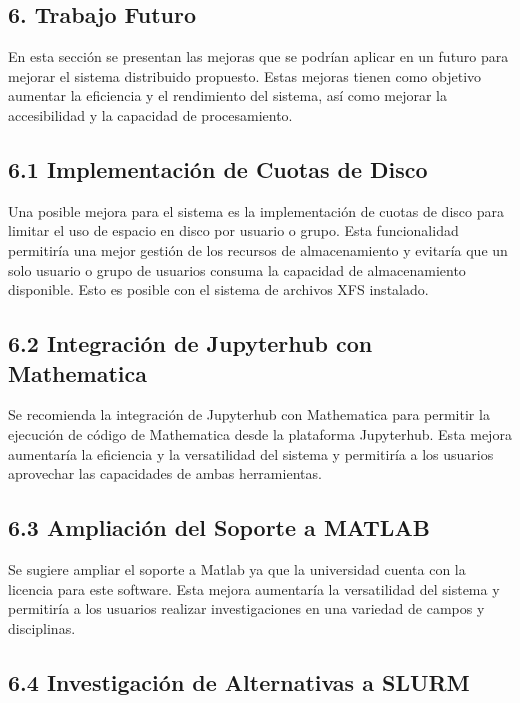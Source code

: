 \begin{spacing}{1.5}
  \begin{tightcenter}
    \section{6. Trabajo Futuro}
    \mylinespacing
  \end{tightcenter}

  En esta sección se presentan las mejoras que se podrían aplicar en un futuro para mejorar el sistema distribuido propuesto. Estas mejoras tienen como objetivo aumentar la eficiencia y el rendimiento del sistema, así como mejorar la accesibilidad y la capacidad de procesamiento.

  \subsection{6.1 Implementación de Cuotas de Disco}

  Una posible mejora para el sistema es la implementación de cuotas de disco para limitar el uso de espacio en disco por usuario o grupo. Esta funcionalidad permitiría una mejor gestión de los recursos de almacenamiento y evitaría que un solo usuario o grupo de usuarios consuma la capacidad de almacenamiento disponible. Esto es posible con el sistema de archivos XFS instalado.

  \subsection{6.2 Integración de Jupyterhub con Mathematica}

  Se recomienda la integración de Jupyterhub con Mathematica para permitir la ejecución de código de Mathematica desde la plataforma Jupyterhub. Esta mejora aumentaría la eficiencia y la versatilidad del sistema y permitiría a los usuarios aprovechar las capacidades de ambas herramientas.

  \subsection{6.3 Ampliación del Soporte a MATLAB}

  Se sugiere ampliar el soporte a Matlab ya que la universidad cuenta con la licencia para este software. Esta mejora aumentaría la versatilidad del sistema y permitiría a los usuarios realizar investigaciones en una variedad de campos y disciplinas.

  \subsection{6.4 Investigación de Alternativas a SLURM}


\end{spacing}
